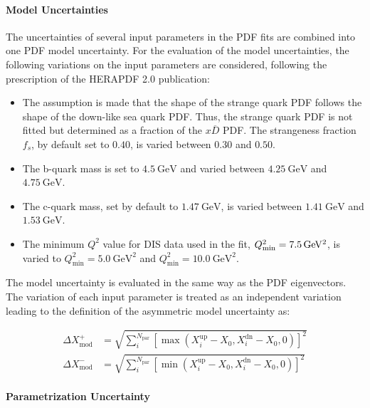 \paragraph{Model Uncertainties} 
The uncertainties of several input parameters in the PDF fits are combined into
one PDF model uncertainty. For the evaluation of the model uncertainties, the
following variations on the input parameters are considered, following the
prescription of the HERAPDF 2.0 publication:
%
\begin{itemize}
\item The assumption is made that the shape of the strange quark PDF follows the
  shape of the down-like sea quark PDF. Thus, the strange quark PDF is not
  fitted but determined as a fraction of the $x\overline{D}$ PDF. The strangeness fraction
  $f_s$, by default set to $0.40$, is varied between $0.30$ and $0.50$.
  \item The b-quark mass is set to $\SI{4.5}{\GeV}$ and varied between
  $\SI{4.25}{\GeV}$ and $\SI{4.75}{\GeV}$.
  \item The c-quark mass, set by default to $\SI{1.47}{\GeV}$, is varied between
  $\SI{1.41}{\GeV}$ and $\SI{1.53}{\GeV}$.
  \item The minimum $Q^2$ value for DIS data used in the fit,
    $Q^2_\mathrm{min}=\SI{7.5}{\GeVsq}$, is varied to $Q^2_\mathrm{min} =
    \SI{5.0}{\GeV\squared}$ and $Q^2_\mathrm{min} = \SI{10.0}{\GeV\squared}$.
\end{itemize}
%
The model uncertainty is evaluated in the same way as the PDF eigenvectors.
The variation of each input parameter is treated as an independent variation
leading to the definition of the asymmetric model uncertainty as:

\begin{align*}
  \Delta X^+_{\mathrm{mod}} &= \sqrt{\sum_i^{N_{\mathrm{par}}} \left[ \max(X_i^{\mathrm{up}}
    -X_0, X_i^{\mathrm{dn}} - X_0, 0)\right]^2}\\
    \Delta X^-_{\mathrm{mod}} &= \sqrt{\sum_i^{N_{\mathrm{par}}} \left[ \min(X_i^{\mathrm{up}} - X_0, X_i^{\mathrm{dn}} - X_0,0)\right]^2}
\end{align*}

\paragraph{Parametrization Uncertainty}

